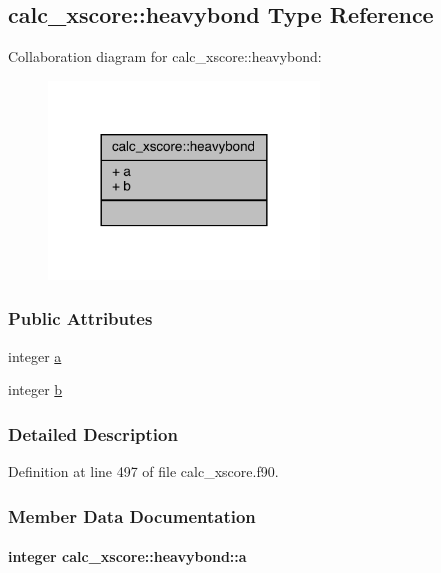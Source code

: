 \hypertarget{structcalc__xscore_1_1heavybond}{\subsection{calc\-\_\-xscore\-:\-:heavybond Type Reference}
\label{structcalc__xscore_1_1heavybond}
}


Collaboration diagram for calc\-\_\-xscore\-:\-:heavybond\-:
\nopagebreak
\begin{figure}[H]
\begin{center}
\leavevmode
\includegraphics[width=204pt]{structcalc__xscore_1_1heavybond__coll__graph}
\end{center}
\end{figure}
\subsubsection*{Public Attributes}
\begin{DoxyCompactItemize}
\item 
integer \hyperlink{structcalc__xscore_1_1heavybond_aeafc7fedfd1bfd5a536f989f5bd2ccd6}{a}
\item 
integer \hyperlink{structcalc__xscore_1_1heavybond_ab7b11fe3afb42efcf209e07e1bd16f8a}{b}
\end{DoxyCompactItemize}


\subsubsection{Detailed Description}


Definition at line 497 of file calc\-\_\-xscore.\-f90.



\subsubsection{Member Data Documentation}
\hypertarget{structcalc__xscore_1_1heavybond_aeafc7fedfd1bfd5a536f989f5bd2ccd6}{
\paragraph[{a}]{\setlength{\rightskip}{0pt plus 5cm}integer calc\-\_\-xscore\-::heavybond\-::a}}\label{structcalc__xscore_1_1heavybond_aeafc7fedfd1bfd5a536f989f5bd2ccd6}


